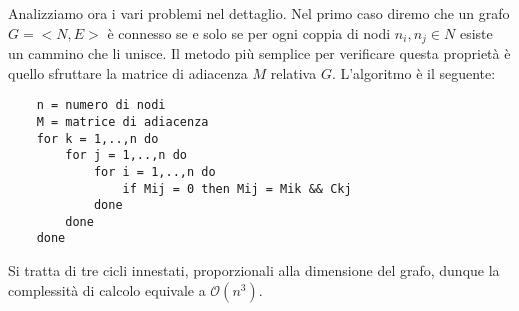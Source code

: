 Analizziamo ora i vari problemi nel dettaglio. Nel primo caso diremo che un grafo $G = <N, E>$ è connesso se e solo se per ogni coppia di nodi $n_i, n_j \in N$ esiste un cammino che li unisce. Il metodo più semplice per verificare questa proprietà è quello sfruttare la matrice di adiacenza $M$ relativa $G$. 
\newpage
L'algoritmo è il seguente:
\begin{verbatim}
    n = numero di nodi
    M = matrice di adiacenza
    for k = 1,..,n do
        for j = 1,..,n do
            for i = 1,..,n do
                if Mij = 0 then Mij = Mik && Ckj
            done
        done
    done
\end{verbatim}
Si tratta di tre cicli innestati, proporzionali alla dimensione del grafo, dunque la complessità di calcolo equivale a $\mathcal{O}(n^3)$.